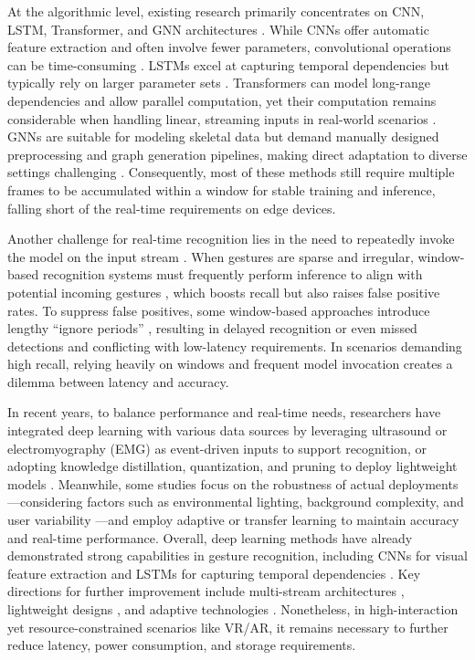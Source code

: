 At the algorithmic level, existing research primarily concentrates on CNN, LSTM, Transformer, and GNN architectures \cite{9873969}. While CNNs offer automatic feature extraction and often involve fewer parameters, convolutional operations can be time-consuming \cite{younesi2024comprehensive}. LSTMs excel at capturing temporal dependencies but typically rely on larger parameter sets \cite{justus2018predicting}. Transformers can model long-range dependencies and allow parallel computation, yet their computation remains considerable when handling linear, streaming inputs in real-world scenarios \cite{fournier2023practical}. GNNs are suitable for modeling skeletal data but demand manually designed preprocessing and graph generation pipelines, making direct adaptation to diverse settings challenging \cite{li2023graph}. Consequently, most of these methods still require multiple frames to be accumulated within a window for stable training and inference, falling short of the real-time requirements on edge devices.

Another challenge for real-time recognition lies in the need to repeatedly invoke the model on the input stream \cite{8578647, shen2024boosting}. When gestures are sparse and irregular, window-based recognition systems must frequently perform inference to align with potential incoming gestures \cite{caputo2021shrec}, which boosts recall but also raises false positive rates. To suppress false positives, some window-based approaches introduce lengthy “ignore periods” \cite{caputo2021shrec}, resulting in delayed recognition or even missed detections and conflicting with low-latency requirements. In scenarios demanding high recall, relying heavily on windows and frequent model invocation creates a dilemma between latency and accuracy.

In recent years, to balance performance and real-time needs, researchers have integrated deep learning with various data sources by leveraging ultrasound \cite{saez2021gesture, bimbraw2024forearm} or electromyography (EMG) \cite{kim2023emg} as event-driven inputs to support recognition, or adopting knowledge distillation, quantization, and pruning to deploy lightweight models \cite{bimbraw2024forearm}. Meanwhile, some studies focus on the robustness of actual deployments—considering factors such as environmental lighting, background complexity, and user variability \cite{murad2024advancements, shen2021imaginative}—and employ adaptive or transfer learning \cite{wu2024gesture, shen2024towards} to maintain accuracy and real-time performance. Overall, deep learning methods have already demonstrated strong capabilities in gesture recognition, including CNNs for visual feature extraction and LSTMs for capturing temporal dependencies \cite{li2021gesture, wu2024gesture}. Key directions for further improvement include multi-stream architectures \cite{rahim2024advanced, yaseen2024next, benitez2020finger}, lightweight designs \cite{bimbraw2024forearm, kim2023emg}, and adaptive technologies \cite{murad2024advancements, al2022structured}. Nonetheless, in high-interaction yet resource-constrained scenarios like VR/AR, it remains necessary to further reduce latency, power consumption, and storage requirements.

